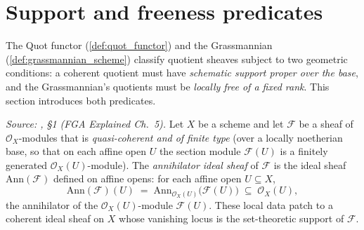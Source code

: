 \section{Support and freeness predicates}
\label{sec:quot_predicates}

The Quot functor (\cref{def:quot_functor}) and the Grassmannian
(\cref{def:grassmannian_scheme}) classify quotient sheaves subject to two
geometric conditions: a coherent quotient must have \emph{schematic support
proper over the base}, and the Grassmannian's quotients must be \emph{locally
free of a fixed rank}. This section introduces both predicates.

\begin{definition}\leanok
  \label{def:modules_annihilator}
  \textit{Source: \cite{nitsure-hilbert-quot}, \S 1 (FGA Explained Ch.~5).}
  Let \(X\) be a scheme and let \(\mathcal{F}\) be a sheaf of
  \(\mathcal{O}_X\)-modules that is \emph{quasi-coherent and of finite type}
  (over a locally noetherian base, so that on each affine open \(U\) the section
  module \(\mathcal{F}(U)\) is a finitely generated \(\mathcal{O}_X(U)\)-module).
  The \emph{annihilator ideal sheaf} of \(\mathcal{F}\) is the ideal sheaf
  \(\mathrm{Ann}(\mathcal{F})\) defined on affine opens: for each affine open
  \(U \subseteq X\),
  \[
    \mathrm{Ann}(\mathcal{F})(U)
    \;=\; \mathrm{Ann}_{\mathcal{O}_X(U)}\bigl(\mathcal{F}(U)\bigr)
    \;\subseteq\; \mathcal{O}_X(U),
  \]
  the annihilator of the \(\mathcal{O}_X(U)\)-module \(\mathcal{F}(U)\). These
  local data patch to a coherent ideal sheaf on \(X\) whose vanishing locus is
  the set-theoretic support of \(\mathcal{F}\).


\end{definition}

